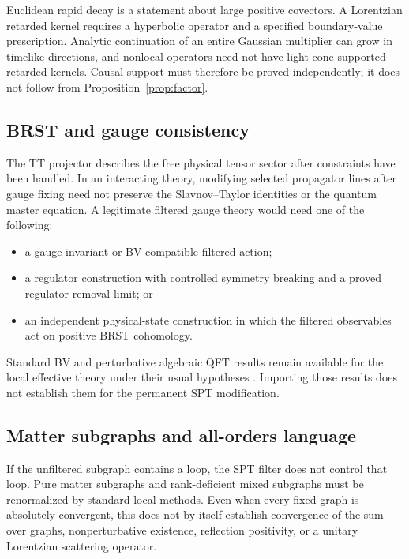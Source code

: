 \documentclass[11pt]{article}
\begin{document}
Euclidean rapid decay is a statement about large positive covectors. A
Lorentzian retarded kernel requires a hyperbolic operator and a specified
boundary-value prescription. Analytic continuation of an entire Gaussian
multiplier can grow in timelike directions, and nonlocal operators need not
have light-cone-supported retarded kernels. Causal support must therefore be
proved independently; it does not follow from
Proposition~\ref{prop:factor}.

\subsection{BRST and gauge consistency}

The TT projector describes the free physical tensor sector after constraints
have been handled. In an interacting theory, modifying selected propagator
lines after gauge fixing need not preserve the Slavnov--Taylor identities or
the quantum master equation. A legitimate filtered gauge theory would need
one of the following:
\begin{itemize}
\item a gauge-invariant or BV-compatible filtered action;
\item a regulator construction with controlled symmetry breaking and a
proved regulator-removal limit; or
\item an independent physical-state construction in which the filtered
observables act on positive BRST cohomology.
\end{itemize}
Standard BV and perturbative algebraic QFT results remain available for the
local effective theory under their usual hypotheses
\cite{BV1981,BV1983,BarnichBrandtHenneaux2000,HollandsWald2001,
HollandsWald2002,Rejzner2016}. Importing those results does not establish
them for the permanent SPT modification.

\subsection{Matter subgraphs and all-orders language}

If the unfiltered subgraph contains a loop, the SPT filter does not control
that loop. Pure matter subgraphs and rank-deficient mixed subgraphs must be
renormalized by standard local methods. Even when every fixed graph is
absolutely convergent, this does not by itself establish convergence of the
sum over graphs, nonperturbative existence, reflection positivity, or a
unitary Lorentzian scattering operator.
\end{document}
